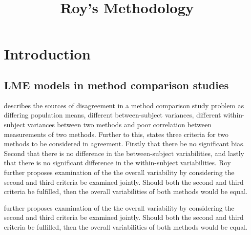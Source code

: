 \documentclass[12pt, a4paper]{report}
\title{Roy's Methodology}
\author{ } \date{ }
\theoremstyle{plain}
\theoremstyle{definition}
\theoremstyle{remark}
\begin{document}
	\tableofcontents
\newpage

\chapter{Introduction}
		\section{LME models in method comparison studies}

		\citet{Barnhart} describes the sources of disagreement in a method comparison study problem as
		differing population means, different between-subject variances, different within-subject variances between two methods and poor
		correlation between measurements of two methods. Further to this, \citet{ARoy2009} states three criteria for two methods to be considered in agreement. Firstly that there be no significant bias. Second that there is no difference in the between-subject variabilities, and lastly that there is no significant difference in the within-subject variabilities. 	Roy further proposes examination of the the overall variability by considering the second and third criteria be examined jointly. Should both the second and third criteria be fulfilled, then the overall variabilities of both methods would be equal.
		
		\citet{ARoy2009} further proposes examination of the the overall variability by considering the second and third criteria be examined jointly. Should both the second and third criteria be fulfilled, then the overall variabilities of both methods would be equal.
		
\end{document}
